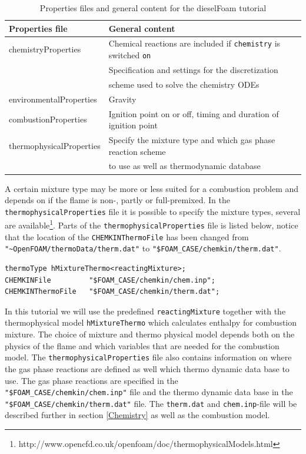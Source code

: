 \documentclass{report}
\begin{document}
\begin{table}[h]
\begin{center}
\begin{tabular}{l|l}
	Properties file & General content \\ \hline
	chemistryProperties & Chemical reactions are included if \verb+chemistry+ is switched \verb+on+ \\ 
			    & Specification and settings for the discretization\\
			    & scheme used to solve the chemistry ODEs\\
	environmentalProperties & Gravity \\
	combustionProperties & Ignition point on or off, timing and duration of ignition point  \\
	thermophysicalProperties & Specify the mixture type and which gas phase reaction scheme \\ 
				 & to use as well as thermodynamic database
\end{tabular}
\caption{Properties files and general content for the dieselFoam tutorial}
\label{Properties files and general content for the dieselFoam tutorial}
\end{center}
\end{table}
\noindent
A certain mixture type may be more or less suited for a combustion problem and depends on if the flame is non-, partly or full-premixed. In the \verb+thermophysicalProperties+ file it is possible to specify the mixture types, several are available\footnote{http://www.opencfd.co.uk/openfoam/doc/thermophysicalModels.html}. Parts of the \verb+thermophysicalProperties+ file is listed below, notice that the location of the \verb+CHEMKINThermoFile+ has been changed from \verb+"~OpenFOAM/thermoData/therm.dat"+ to \verb+"$FOAM_CASE/chemkin/therm.dat"+. 
\begin{verbatim}
thermoType hMixtureThermo<reactingMixture>;
CHEMKINFile         "$FOAM_CASE/chemkin/chem.inp";
CHEMKINThermoFile   "$FOAM_CASE/chemkin/therm.dat";
\end{verbatim}
In this tutorial we will use the predefined \verb+reactingMixture+ together with the thermophysical model \verb+hMixtureThermo+ which calculates enthalpy for combustion mixture. The choice of mixture and thermo physical model depends both on the physics of the flame and which variables that are needed for the combustion model. The \verb+thermophysicalProperties+ file also contains information on where the gas phase reactions are defined as well which thermo dynamic data base to use. The gas phase reactions are specified in the \verb+"$FOAM_CASE/chemkin/chem.inp"+ file and the thermo dynamic data base in the \verb+"$FOAM_CASE/chemkin/therm.dat"+ file. The \verb+therm.dat+ and \verb+chem.inp+-file will be described further in section \ref{Chemistry} as well as the combustion model.    
\end{document}
